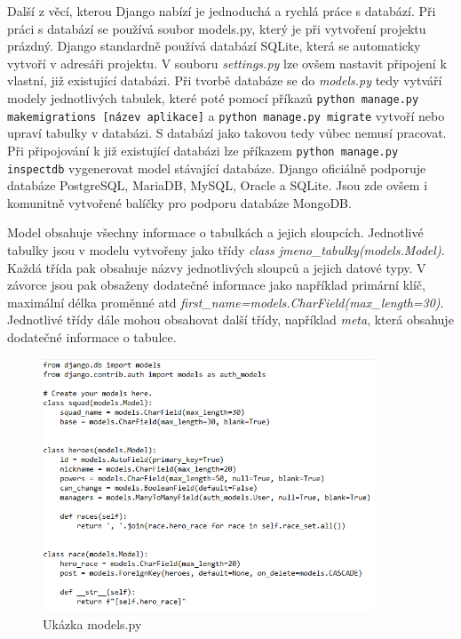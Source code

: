 Další z věcí, kterou Django nabízí je jednoduchá a rychlá
práce s databází. Při práci s databází se používá soubor models.py,
který je při vytvoření projektu prázdný. Django standardně používá
databází SQLite, která se automaticky vytvoří v adresáři projektu. V
souboru \emph{settings.py} lze ovšem nastavit připojení k vlastní, již
existující databázi. Při tvorbě databáze se do \emph{models.py} tedy vytváří
modely jednotlivých tabulek, které poté pomocí příkazů {\tt python manage.py makemigrations [název aplikace]}
a {\tt python manage.py migrate} vytvoří nebo upraví tabulky v databázi. S databází jako
takovou tedy vůbec nemusí pracovat. Při připojování k již
existující databázi lze příkazem {\tt python manage.py inspectdb} vygenerovat model stávající
databáze. Django oficiálně podporuje databáze PostgreSQL, MariaDB,
MySQL, Oracle a SQLite. Jsou zde ovšem i komunitně vytvořené balíčky
pro podporu  databáze MongoDB. \cite{django}

Model obsahuje všechny informace o tabulkách a jejich
sloupcích. Jednotlivé tabulky jsou v modelu vytvořeny jako třídy \emph{class
jmeno\_tabulky(models.Model)}. Každá třída pak obsahuje názvy
jednotlivých sloupců a jejich datové typy. V závorce jsou pak obsaženy
dodatečné informace jako například primární klíč, maxi\-mální délka
proměnné atd
\textit{first\_name=models.CharField(max\_length=30)}. Jednotlivé
třídy dále mohou obsahovat další třídy, například \textit{meta}, která obsahuje
dodatečné informace o tabulce.

\vspace{15px}

\begin{figure}[H] \centering
  \includegraphics[width=280pt]{./pictures/2-model-example.png}
    \caption[Model příklad]{Ukázka models.py}
	\label{fig:Ukázka models.py}                                
\end{figure}

